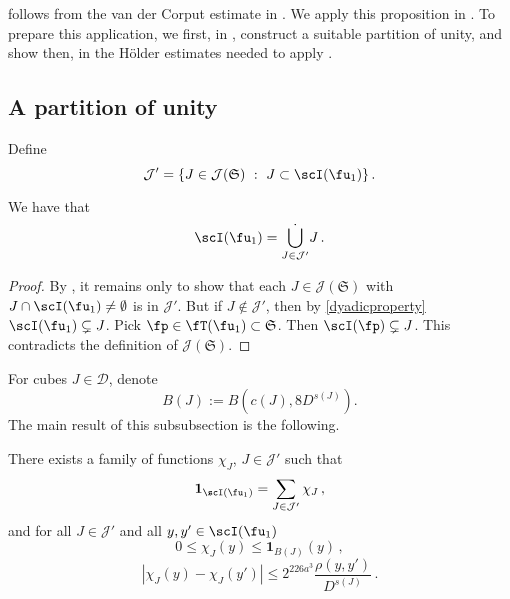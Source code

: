  follows from the van der Corput estimate in . We apply this proposition in . To prepare this application, we first, in , construct a suitable partition of unity, and show then, in  the H\"older estimates needed to apply .

\subsection{A partition of unity}
\label{subsubsec-pao}
    Define
    $$
        \mathcal{J}' = \{J \in \mathcal{J}(\mathfrak{S}) \ : \ J \subset \scI(\fu_1)\}\,.
    $$

    \begin{lemma}
        \label{dyadic-partition-1}
        We have that
        $$
            \scI(\fu_1) = \dot{\bigcup_{J \in \mathcal{J}'}} J\,.
        $$
    \end{lemma}

    \begin{proof}
        By , it remains only to show that each $J \in \mathcal{J}(\mathfrak{S})$ with $J \cap \scI(\fu_1) \ne \emptyset$ is in $\mathcal{J}'$. But if $J \notin \mathcal{J}'$, then by \eqref{dyadicproperty} $\scI(\fu_1) \subsetneq J$. Pick $\fp \in \fT(\fu_1) \subset \mathfrak{S}$. Then $\scI(\fp) \subsetneq J$. This contradicts the definition of $\mathcal{J}(\mathfrak{S})$.
    \end{proof}

    For cubes $J \in \mathcal{D}$, denote
    \begin{equation}
        \label{def-BJ}
        B(J) := B(c(J), 8D^{s(J)}).
    \end{equation}
    The main result of this subsubsection is the following.

    \begin{lemma}
        \label{Lipschitz-partition-unity}
        There exists a family of functions $\chi_J$, $J \in \mathcal{J}'$ such that \begin{equation}
            \label{eq-pao-1}
            \mathbf{1}_{\scI(\fu_1)} = \sum_{J \in \mathcal{J}'} \chi_J\,,
        \end{equation}
        and for all $J \in \mathcal{J}'$ and all $y,y' \in \scI(\fu_1)$
        \begin{equation}
            \label{eq-pao-2}
            0 \leq \chi_J(y) \leq \mathbf{1}_{B(J)}(y)\,,
        \end{equation}
        \begin{equation}
            \label{eq-pao-3}
            |\chi_J(y) - \chi_J(y')| \le 2^{226a^3} \frac{\rho(y,y')}{D^{s(J)}}\,.
        \end{equation}
    \end{lemma}

